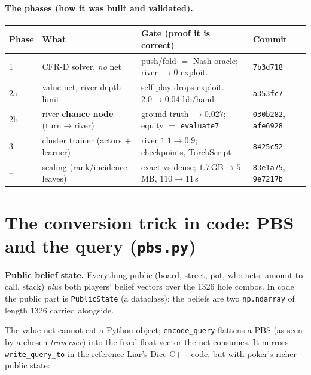 \documentclass[11pt,a4paper]{article}
\newcommand{\file}[1]{\textcolor{accent}{\texttt{#1}}}
\newcommand{\fn}[1]{\texttt{#1}}
\begin{document}
\paragraph{The phases (how it was built and validated).}
\begin{center}\small
\begin{tabular}{@{}llll@{}}
\toprule
Phase & What & Gate (proof it is correct) & Commit \\
\midrule
1   & CFR-D solver, \emph{no} net          & push/fold $=$ Nash oracle; river $\to 0$ exploit. & \texttt{7b3d718} \\
2a  & value net, river depth limit         & self-play drops exploit. $2.0\to0.04$ bb/hand     & \texttt{a353fc7} \\
2b  & river \textbf{chance node} (turn$\to$river) & ground truth $\to 0.027$; equity $=$ \texttt{evaluate7} & \texttt{030b282}, \texttt{afe6928} \\
3   & cluster trainer (actors $+$ learner) & river $1.1\to0.9$; checkpoints, TorchScript       & \texttt{8425c52} \\
--  & scaling (rank/incidence leaves)      & exact vs dense; $1.7$\,GB$\to5$\,MB, $110\to11$\,s & \texttt{83e1a75}, \texttt{9e7217b} \\
\bottomrule
\end{tabular}
\end{center}

\section{The conversion trick in code: PBS and the query (\file{pbs.py})}

\begin{defbox}
\textbf{Public belief state.} Everything public (board, street, pot, who acts,
amount to call, stack) \emph{plus} both players' belief vectors over the 1326
hole combos. In code the public part is \fn{PublicState} (a dataclass); the
beliefs are two \texttt{np.ndarray} of length 1326 carried alongside.
\end{defbox}

The value net cannot eat a Python object; \fn{encode\_query} flattens a PBS (as
seen by a chosen \emph{traverser}) into the fixed float vector the net consumes.
It mirrors \texttt{write\_query\_to} in the reference Liar's Dice C++ code, but
with poker's richer public state:
\end{document}
